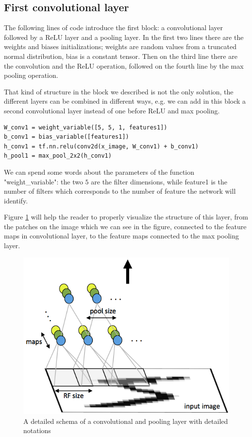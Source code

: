 \subsection{First convolutional layer}

The following lines of code introduce the first block: a convolutional layer followed by a ReLU layer and a pooling layer. In the first two lines there are the weights and biases initializations; weights are random values from a truncated normal distribution, bias is a constant tensor. Then on the third line there are the convolution and the \acs{ReLU} operation, followed on the fourth line by the max pooling operation.

That kind of structure in the block we described is not the only solution, the different layers can be combined in different ways, e.g. we can add in this block a second convolutional layer instead of one before ReLU and max pooling.

\begin{lstlisting}
W_conv1 = weight_variable([5, 5, 1, features1])
b_conv1 = bias_variable([features1])
h_conv1 = tf.nn.relu(conv2d(x_image, W_conv1) + b_conv1)
h_pool1 = max_pool_2x2(h_conv1)
\end{lstlisting}

We can spend some words about the parameters of the function "weight_variable": the two $5$ are the filter dimensions, while feature1 is the number of filters which corresponds to the number of feature the network will identify.

Figure \ref{fig:conv_layer} will help the reader to properly visualize the structure of this layer, from the patches on the image which we can see in the figure, connected to the feature maps in convolutional layer, to the feature maps connected to the max pooling layer.

\begin{figure}
	\caption{A detailed schema of a convolutional and pooling layer with detailed notations}
	\label{fig:conv_layer}
	\centering
	\includegraphics[width=1\textwidth]{Images/conv_layer}
\end{figure}

